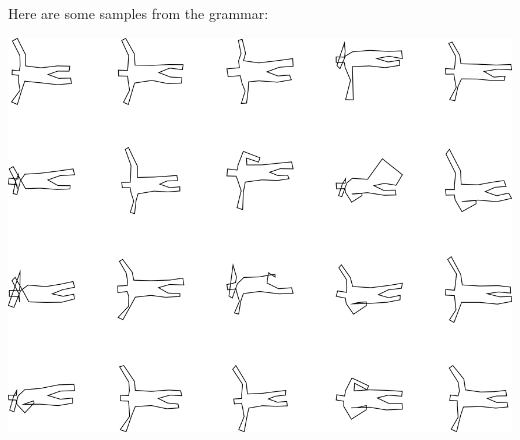 Here are some samples from the grammar:

\includegraphics[width=6in]{output/3.learning/incremental/gram.21.d/samples.png}

